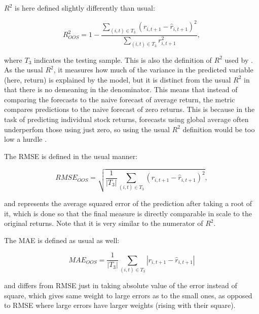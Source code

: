 			$R^2$ is here defined slightly differently than usual:
			
			\begin{equation*}
				R^2_{OOS} = 1 - \frac{ \sum_{(i,t)\in T_3} \left(r_{i,t+1}-	\hat{r}_{i, t+1}\right) ^2}{\sum_{(i,t)\in T_3} r_{i,t+1}^2}, 		
			\end{equation*}
			
			where $T_3$ indicates the testing sample. This is also the definition of $R^2$ used by \cite{gu2020empirical}. As the usual $R^2$, it measures how much of the variance in the predicted variable (here, return) is explained by the model, but it is distinct from the usual $R^2$ in that there is no demeaning in the denominator. This means that instead of comparing the forecasts to the naive forecast of average return, the metric compares predictions to the naive forecast of zero returns. This is because in the task of predicting individual stock returns, forecasts using global average often underperfom those using just zero, so using the usual $R^2$ definition would be too low a hurdle \citep{gu2020empirical}. 
			
			The RMSE is defined in the usual manner:   
			
			\begin{equation*}
				RMSE_{OOS} = \sqrt{ \frac{1}{|T_3|} \sum_{(i,t)\in T_3} \left(r_{i,t+1}-	\hat{r}_{i, t+1}\right) ^2},	
			\end{equation*}
			
			and represents the average squared error of the prediction after taking a root of it, which is done so that the final measure is directly comparable in scale to the original returns. Note that it is very similar to the numerator of $R^2$.
			
			The MAE is defined as usual as well: 
			
			\begin{equation*}
				MAE_{OOS} = \frac{1}{|T_3|} \sum_{(i,t)\in T_3} |r_{i,t+1}-	\hat{r}_{i, t+1}|
			\end{equation*}
			
			and differs from RMSE just in taking absolute value of the error instead of square, which gives same weight to large errors as to the small ones, as opposed to RMSE where large errors have larger weights (rising with their square). 
	
